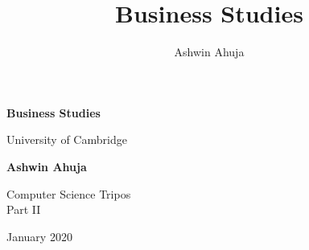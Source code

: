 \documentclass{article}
\title{Business Studies}
\author{Ashwin Ahuja}
\begin{document}
\begin{titlepage}
\begin{center}
			\vspace*{1cm}
			
			\Huge
			\textbf{Business Studies}
			
			\vspace{0.5cm}
			\LARGE
			University of Cambridge
			
			\vspace{1.5cm}
			
			\textbf{Ashwin Ahuja}
			
			\vfill
			
			Computer Science Tripos \\
			Part II
			
			\vspace{5cm}
			
			January 2020
			
\end{center}
\end{titlepage}

\tableofcontents
\pagebreak
\end{document}
